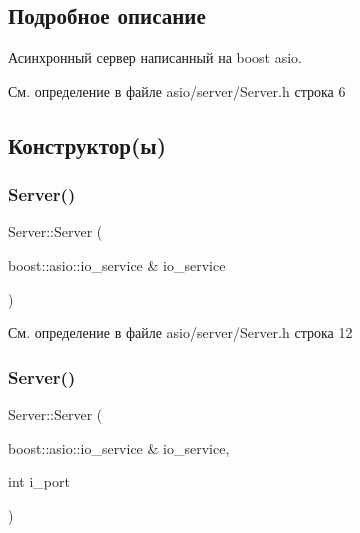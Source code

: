 \subsection{Подробное описание}
Асинхронный сервер написанный на boost asio. 

См. определение в файле asio/server/\+Server.\+h строка 6



\subsection{Конструктор(ы)}
\mbox{\label{class_server_ac9ad7c8bb7fe2f5da5101da1297c9ae1}} 
\subsubsection{\texorpdfstring{Server()}{Server()}\hspace{0.1cm}{\footnotesize\ttfamily [1/2]}}
{\footnotesize\ttfamily Server\+::\+Server (\begin{DoxyParamCaption}\item[{boost\+::asio\+::io\+\_\+service \&}]{io\+\_\+service }\end{DoxyParamCaption})\hspace{0.3cm}{\ttfamily [inline]}}



См. определение в файле asio/server/\+Server.\+h строка 12

\mbox{\label{class_server_a64e726d6d9e85b00ba86488badb330d4}} 
\subsubsection{\texorpdfstring{Server()}{Server()}\hspace{0.1cm}{\footnotesize\ttfamily [2/2]}}
{\footnotesize\ttfamily Server\+::\+Server (\begin{DoxyParamCaption}\item[{boost\+::asio\+::io\+\_\+service \&}]{io\+\_\+service,  }\item[{int}]{i\+\_\+port }\end{DoxyParamCaption})\hspace{0.3cm}{\ttfamily [inline]}}



